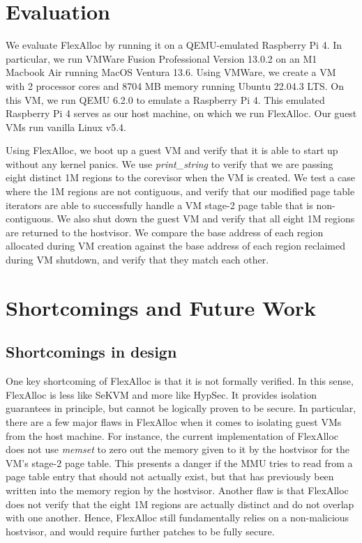 \section{Evaluation}

We evaluate FlexAlloc by running it on a QEMU-emulated Raspberry Pi 4. In
particular, we run VMWare Fusion Professional Version 13.0.2 on an M1 Macbook
Air running MacOS Ventura 13.6. Using VMWare, we create a VM
with 2 processor cores and 8704 MB memory running Ubuntu 22.04.3 LTS. On this
VM, we run QEMU 6.2.0 to emulate a Raspberry Pi 4. This emulated Raspberry
Pi 4 serves as our host machine, on which we run FlexAlloc. Our guest VMs
run vanilla Linux v5.4.

Using FlexAlloc, we boot up a guest VM and verify that it is able to start up
without any kernel panics. We use \textit{print\_string} to verify that we
are passing eight distinct 1M regions to the corevisor when the VM is created.
We test a case where the 1M regions are not contiguous, and verify that our
modified page table iterators are able to successfully handle a VM stage-2 page
table that is non-contiguous. We also shut down the guest VM and verify that
all eight 1M regions are returned to the hostvisor. We compare the base address
of each region allocated during VM creation against the base address of each
region reclaimed during VM shutdown, and verify that they match each other.

\section{Shortcomings and Future Work}

\subsection{Shortcomings in design}

One key shortcoming of FlexAlloc is that it is not formally verified. In
this sense, FlexAlloc is less like SeKVM and more like HypSec. It provides isolation guarantees
in principle, but cannot be logically proven to be secure. In particular, there
are a few major flaws in FlexAlloc when it comes to isolating guest VMs from
the host machine. For instance, the current implementation of FlexAlloc
does not use \textit{memset} to zero out the memory given to it by the hostvisor
for the VM's stage-2 page table. This presents a danger if the MMU tries to
read from a page table entry that should not actually exist, but that has
previously been written into the memory region by the hostvisor. Another flaw is that
FlexAlloc does not verify that the eight 1M regions are actually distinct and
do not overlap with one another. Hence, FlexAlloc still fundamentally relies on
a non-malicious hostvisor, and would require further patches to be fully secure.

